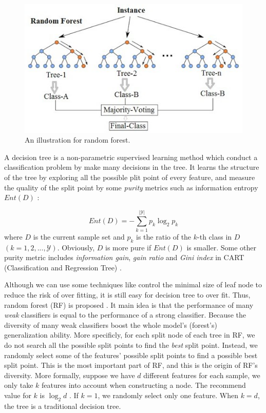 \documentclass[sigconf]{acmart}
\begin{document}
	\begin{figure}[h]
	\centering
	\includegraphics[width=0.8\linewidth]{../figs/rand-forest}
	\caption{An illustration for random forest.}
	\label{fig:rand-forest}
	\end{figure}
	
	A decision tree is a non-parametric supervised learning method which conduct a classification problem by make many decisions in the tree. It learns the structure of the tree by exploring all the possible plit point of every feature, and measure the quality of the split point by some \textit{purity} metrics such as information entropy $Ent(D)$ :
	
	\begin{equation}
		Ent(D)=-\sum_{k=1}^{|\mathcal{Y}|}p_k\log_2p_k
	\end{equation}
	where $D$ is the current sample set and $p_k$ is the ratio of the $k$-th class in $D$ $(k=1,2,...,\mathcal{Y})$. Obviously, $D$ is more pure if $Ent(D)$ is smaller.
	Some other purity metric includes \textit{information gain}, \textit{gain ratio} and \textit{Gini index} in CART (Classification and Regression Tree)  \cite{breiman1984classification}.
	
	Although we can use some techniques like control the minimal size of leaf node to reduce the risk of over fitting, it is still easy for decision tree to over fit. Thus, random forest (RF) is proposed \cite{breiman2001random}. It main idea is that the performance of many \textit{weak} classifiers is equal to the performance of a strong classifier. Because the diversity of many weak classifiers boost the whole model's (forest's) generalization ability. More specificly, for each split node of each tree in  RF, we do not search all the possible split points to find the \textit{best} split point. Instead, we randomly select some of the features' possible split points to find a possible best split point. This is the most important part of RF, and this is the origin of RF's diversity. More formally, suppose we have $d$ different features for each sample, we only take $k$ features into account when constructing a node. The recommend value for $k$ is $\log_2d$ \cite{breiman2001random}. If $k=1$, we randomly select only one feature. When $k=d$, the
	tree is a traditional decision tree.
	
\end{document}
